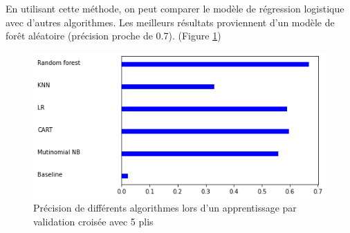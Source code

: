 En utilisant cette méthode, on peut comparer le modèle de régression logistique avec d'autres algorithmes. Les meilleurs résultats proviennent d'un modèle de forêt aléatoire (précision proche de 0.7). (Figure \ref{comparaison})

\begin{figure}
    \centerz
    \includegraphics[scale=.6]{img/comparaison.png}
    \caption{Précision de différents algorithmes lors d'un apprentissage par validation croisée avec 5 plis}
    \label{comparaison}
\end{figure}